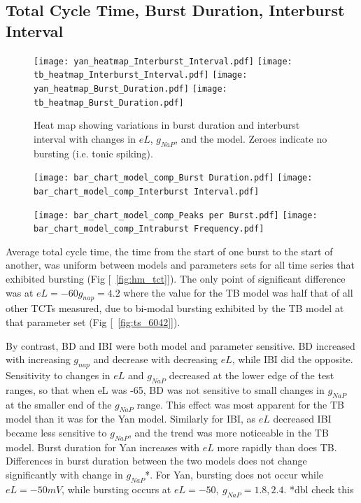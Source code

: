 \documentclass[11pt]{article}
\begin{document}
\subsection{Total Cycle Time, Burst Duration, Interburst Interval}

\begin{figure}[h]
	\centering
	\texttt{[image: yan\_heatmap\_Interburst\_Interval.pdf]}
	\texttt{[image: tb\_heatmap\_Interburst\_Interval.pdf]}
	\texttt{[image: yan\_heatmap\_Burst\_Duration.pdf]}
	\texttt{[image: tb\_heatmap\_Burst\_Duration.pdf]}
	\caption{Heat map showing variations in burst duration and interburst interval with changes in $eL$, $g_{NaP}$, and the model. Zeroes indicate no bursting (i.e. tonic spiking).}
\end{figure}

\begin{figure}[h]
\texttt{[image: bar\_chart\_model\_comp\_Burst Duration.pdf]}
\texttt{[image: bar\_chart\_model\_comp\_Interburst Interval.pdf]}
\end{figure}

\begin{figure}[h]
\texttt{[image: bar\_chart\_model\_comp\_Peaks per Burst.pdf]}
\texttt{[image: bar\_chart\_model\_comp\_Intraburst Frequency.pdf]}
\end{figure}

Average total cycle time, the time from the start of one burst to the start of another, was uniform between models and parameters sets for all time series that exhibited bursting (Fig [~\ref{fig:hm_tct}]). The only point of significant difference was at $eL=-60 g_{nap} = 4.2$ where the value for the TB model was half that of all other TCTs measured, due to bi-modal bursting exhibited by the TB model at that parameter set (Fig [~\ref{fig:ts_6042}]). 

By contrast, BD and IBI were both model and parameter sensitive. BD increased with increasing $g_{nap}$ and decrease with decreasing $eL$, while IBI did the opposite. Sensitivity to changes in $eL$ and $g_{NaP}$ decreased at the lower edge of the test ranges, so that when eL was -65, BD was not sensitive to small changes in $g_{NaP}$ at the smaller end of the $g_{NaP}$ range. This effect was most apparent for the TB model than it was for the Yan model. Similarly for IBI,  as $eL$ decreased IBI became less sensitive to $g_{NaP}$, and the trend was more noticeable in the TB model. Burst duration for Yan increases with $eL$ more rapidly than does TB. Differences in burst duration between the two models does not change significantly with change in $g_{NaP}$*. For Yan, bursting does not occur while $eL = -50 mV$, while bursting occurs at $eL=-50,\  g_{NaP}=1.8, 2.4$. 
*dbl check this
\end{document}
